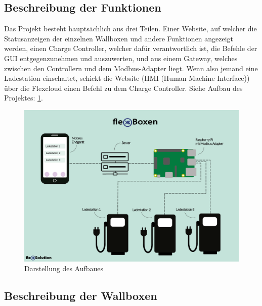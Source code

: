 \subsection{Beschreibung der Funktionen}
Das Projekt besteht hauptsächlich aus drei Teilen.
Einer Website, auf welcher die Statusanzeigen der 
einzelnen Wallboxen und andere Funktionen angezeigt
werden, einen Charge Controller, welcher dafür 
verantwortlich ist, die Befehle der GUI entgegenzunehmen 
und auszuwerten, und aus einem Gateway, welches zwischen 
den Controllern und dem Modbus-Adapter liegt. Wenn also 
jemand eine Ladestation einschaltet, schickt die Website 
(HMI (Human Machine Interface)) über die Flexcloud einen 
Befehl zu dem Charge Controller. 
Siehe Aufbau des Projektes: \ref{fig:impl:Infografik_FlexBoxen}.

  \begin{figure}[h t]
    \centering
    \includegraphics[scale=0.5]{pics/Infografik_FlexBoxen.png}
    \caption{Darstellung des Aufbaues}
    \label{fig:impl:Infografik_FlexBoxen}
\end{figure}





\subsection{Beschreibung der Wallboxen}

